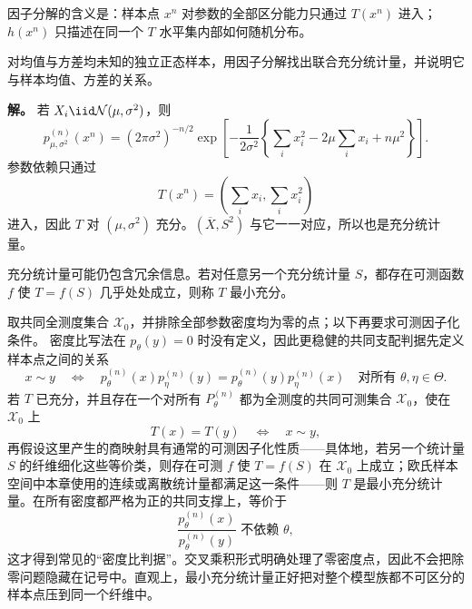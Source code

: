 因子分解的含义是：样本点 $x^n$ 对参数的全部区分能力只通过 $T(x^n)$ 进入；$h(x^n)$ 只描述在同一个 $T$ 水平集内部如何随机分布。

\begin{exbox}[正态样本中的充分统计量]
对均值与方差均未知的独立正态样本，用因子分解找出联合充分统计量，并说明它与样本均值、方差的关系。

\textbf{解。} 若 $X_i\iid\mathcal N(\mu,\sigma^2)$，则
\[
 p_{\mu,\sigma^2}^{(n)}(x^n)
 =(2\pi\sigma^2)^{-n/2}
 \exp\!\left[-\frac{1}{2\sigma^2}
 \left\{\sum_i x_i^2-2\mu\sum_i x_i+n\mu^2\right\}\right].
\]
参数依赖只通过
\[
 T(x^n)=\left(\sum_i x_i,\sum_i x_i^2\right)
\]
进入，因此 $T$ 对 $(\mu,\sigma^2)$ 充分。$(\overline X,S^2)$ 与它一一对应，所以也是充分统计量。
\end{exbox}

\begin{definition}[最小充分统计量]
充分统计量可能仍包含冗余信息。若对任意另一个充分统计量 $S$，都存在可测函数 $f$ 使 $T=f(S)$ 几乎处处成立，则称 $T$ 最小充分。
\end{definition}

\begin{proposition}[最小充分的似然比例判据]
取共同全测度集合 $\mathcal X_0$，并排除全部参数密度均为零的点；以下再要求可测因子化条件。
密度比写法在 $p_\theta(y)=0$ 时没有定义，因此更稳健的共同支配判据先定义样本点之间的关系
\begin{equation}\label{eq:math-stat-minimal-sufficiency-cross-product}
 x\sim y
 \quad\Longleftrightarrow\quad
 p_\theta^{(n)}(x)p_\eta^{(n)}(y)
 =p_\theta^{(n)}(y)p_\eta^{(n)}(x)
 \quad\text{对所有 }\theta,\eta\in\Theta.
\end{equation}
若 $T$ 已充分，并且存在一个对所有 $P_\theta^{(n)}$ 都为全测度的共同可测集合 $\mathcal X_0$，使在 $\mathcal X_0$ 上
\begin{equation}\label{eq:math-stat-minimal-sufficiency-fibers}
 T(x)=T(y)
 \quad\Longleftrightarrow\quad
 x\sim y,
\end{equation}
再假设这里产生的商映射具有通常的可测因子化性质——具体地，若另一个统计量 $S$ 的纤维细化这些等价类，则存在可测 $f$ 使 $T=f(S)$ 在 $\mathcal X_0$ 上成立；欧氏样本空间中本章使用的连续或离散统计量都满足这一条件——则 $T$ 是最小充分统计量。在所有密度都严格为正的共同支撑上，等价于
\[
 \frac{p_\theta^{(n)}(x)}{p_\theta^{(n)}(y)}
 \text{ 不依赖 }\theta,
\]
这才得到常见的“密度比判据”。交叉乘积形式明确处理了零密度点，因此不会把除零问题隐藏在记号中。直观上，最小充分统计量正好把对整个模型族都不可区分的样本点压到同一个纤维中。
\end{proposition}

